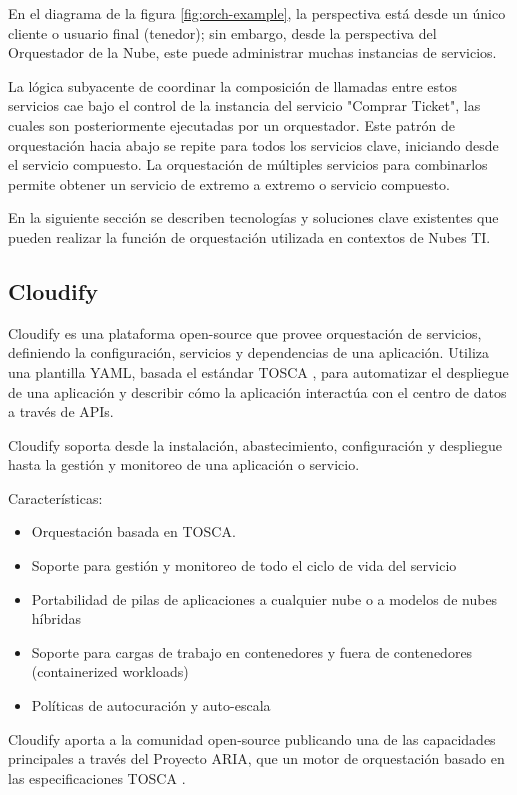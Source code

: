         En el diagrama de la figura \ref{fig:orch-example}, la perspectiva está desde un único cliente o usuario final (tenedor); sin embargo, desde la perspectiva del Orquestador de la Nube, este puede administrar muchas instancias de servicios. 
        
        La lógica subyacente de coordinar la composición de llamadas entre estos servicios cae bajo el control de la instancia del servicio "Comprar Ticket", las cuales son posteriormente ejecutadas por un orquestador. Este patrón de orquestación hacia abajo se repite para todos los servicios clave, iniciando desde el servicio compuesto. La orquestación de múltiples servicios para combinarlos permite obtener un servicio de extremo a extremo o servicio compuesto. 
        
        En la siguiente sección se describen tecnologías y soluciones clave existentes que pueden realizar la función de orquestación utilizada en contextos de Nubes TI.
	    
	    \subsection{Cloudify}
        Cloudify \cite{Cloudify2016-qi} es una plataforma open-source que provee orquestación de servicios, definiendo la configuración, servicios y dependencias de una aplicación. Utiliza una plantilla YAML, basada el estándar TOSCA \cite{Oasis2016-sk}, para automatizar el despliegue de una aplicación y describir cómo la aplicación interactúa con el centro de datos a través de APIs.
        
        Cloudify soporta desde la instalación, abastecimiento, configuración y despliegue hasta la gestión y monitoreo de una aplicación o servicio.
    	    
    
Características:
\begin{itemize}
\item Orquestación basada en TOSCA.
\item Soporte para gestión y monitoreo de todo el ciclo de vida del servicio
\item Portabilidad de pilas de aplicaciones a cualquier nube o a modelos de nubes híbridas
\item Soporte para cargas de trabajo en contenedores y fuera de contenedores (containerized workloads)
\item Políticas de autocuración y auto-escala
\end{itemize}
Cloudify aporta a la comunidad open-source publicando una de las capacidades principales a través del Proyecto ARIA, que un motor de orquestación basado en las especificaciones TOSCA 
\cite{Oasis2016-sk}.

